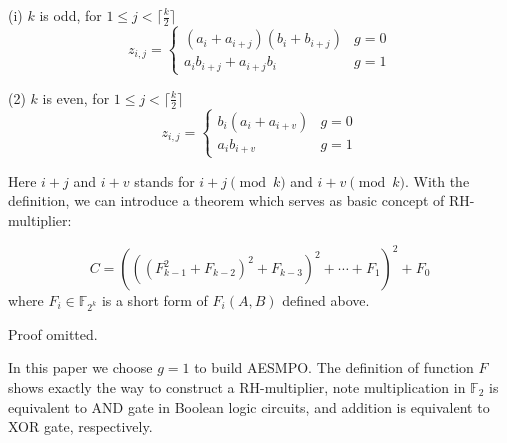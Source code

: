 (i) $k$ is odd, for $1\leq j < \lceil \frac{k}{2} \rceil$
\begin{displaymath}
z_{i,j} = \left\{
\begin{array}{ll}
(a_i+a_{i+j})(b_i+b_{i+j}) & g=0\\
a_ib_{i+j} + a_{i+j}b_i & g=1
\end{array}\right.
\end{displaymath}

(2) $k$ is even, for $1\leq j < \lceil \frac{k}{2} \rceil$
\begin{displaymath}
z_{i,j} = \left\{
\begin{array}{ll}
b_i(a_i+a_{i+v}) & g=0\\
a_ib_{i+v} & g=1
\end{array}\right.
\end{displaymath}

Here $i+j$ and $i+v$ stands for $i+j \pmod k$ and $i+v\pmod k$. With the definition, we can
introduce a theorem which serves as basic concept of RH-multiplier:
\begin{Theorem}
$$C = (((F_{k-1}^2 + F_{k-2})^2 + F_{k-3})^2 + \cdots + F_1)^2 + F_0$$
where $F_i\in \mathbb F_{2^k}$ is a short form of $F_i(A,B)$ defined above.
\end{Theorem}
Proof omitted.

In this paper we choose $g=1$ to build AESMPO. The definition of function $F$ shows exactly
the way to construct a RH-multiplier, note multiplication in $\mathbb F_2$ is equivalent to
AND gate in Boolean logic circuits, and addition is equivalent to XOR gate, respectively.
